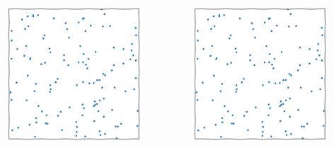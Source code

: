 \documentclass[aspectratio=169]{beamer}
\begin{document}
\begin{frame}
\begin{columns}[t]
        \centerline{\includegraphics[width=0.8\textwidth,page=15]{figures/himmelblau}}
        \centerline{\includegraphics[width=0.8\textwidth,page=14]{figures/himmelblau}}
    \end{columns}
\end{frame}
\end{document}
